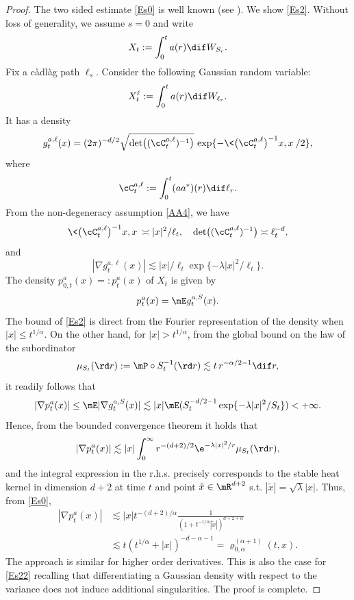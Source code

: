 \begin{proof}
The two sided estimate \eqref{Es0} is well known (see \eg \cite{Ch-Zh1}).
We show \eqref{Es2}.
Without loss of generality, we assume $s=0$ and write
\[
X_{t}:=\int^t_0a(r)\dif W_{S_r}.
\]
Fix a càdlàg path $\ell_s$. Consider the following Gaussian random variable:
\[
X^\ell_{t}:=\int^t_0a(r)\dif W_{\ell_r}.
\]
It has a density
\begin{equation*}%
g^{a,\ell}_{t}(x)=(2\pi)^{-d/2}\sqrt{\det\bigl( (\cC_{t}^{a,\ell})^{-1}\bigr)}\,\exp\{-\<\bigl(\cC_t^{a,\ell}\bigr)^{-1}x,x\>/2\},
\end{equation*}
where
\[
\cC_t^{a,\ell}:=\int^t_0(aa^*)(r)\dif \ell_r.
\]
From the non-degeneracy assumption \eqref{AA4}, we have
\[
\<\bigl(\cC_t^{a,\ell}\bigr)^{-1}x,x\>\asymp|x|^2/\ell_t,\quad \det\bigl( (\cC_t^{a,\ell})^{-1}\bigr)\asymp \ell_t^{-d},
\]
and
\[
|\nabla g^{a,\ell}_{t}(x)|\lesssim |x|/\ell_t\exp\{-\lambda|x|^2/\ell_t\}.
\]
The density $p_{0,t}^{a}(x)=:p_{t}^{a}(x)$ of $X_{t}$ is given by
\begin{equation}\label{SUB_STABLE_DENS}
p_{t}^{a}(x)=\mE g^{a,S}_{t}(x).
\end{equation}
The bound of \eqref{Es2} is direct from the Fourier representation of the density when $|x|\le t^{1/\alpha}$.
On the other hand, for $|x|>t^{1/\alpha} $, from the global bound on the law of the subordinator
\[
\mu_{S_t}(\rd r):=\mP\circ S_t^{-1}(\rd r)\lesssim t\, r^{-\alpha/2-1}\dif r,
\]
it readily follows that
\begin{equation*}
|\nabla p_{t}^a(x)|\leq\mE |\nabla g^{a,S}_{t}(x)|
\lesssim|x|\mE(S_t^{-d/2-1}\exp\{-\lambda|x|^2/S_t\})<+\infty.
\end{equation*}
Hence, from the bounded convergence theorem it holds that
\begin{equation*}
|\nabla p_{t}^a(x)|\lesssim|x|\int^\infty_0 r^{-(d+2)/2}\e^{-\lambda |x|^2/r}\mu_{S_t}(\rd r),
\end{equation*}
and the integral expression in the r.h.s. precisely corresponds to the stable heat kernel in dimension $d+2$ at time $t$ and point $\tilde x\in \mR^{d+2} $ s.t. $|\tilde x|=\sqrt{\lambda}|x| $. Thus, from \eqref{Es0},
\begin{align*}
|\nabla p_{t}^a(x)|&\lesssim |x| t^{-(d+2)/\alpha}\frac{1}{(1+t^{-1/\alpha} |\tilde x|)^{d+2+\alpha}}\\
&\lesssim t(t^{1/\alpha}+|x|)^{-d-\alpha-1}=\varrho^{(\alpha+1)}_{0,\alpha}(t,x).
\end{align*}
The approach is similar for higher order derivatives. This is also the case for \eqref{Es22} recalling that differentiating a Gaussian density with respect to the variance does not induce additional singularities.
The proof is complete.
\end{proof}
